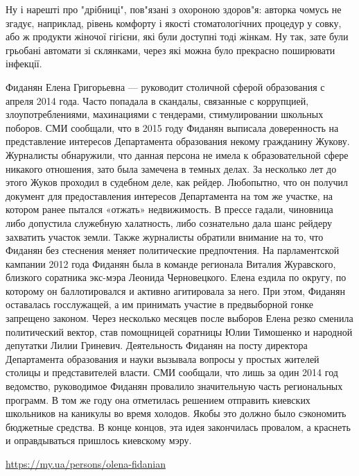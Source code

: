 \begin{itemize}
Ну і нарешті про "дрібниці", пов"язані з охороною здоров"я: авторка чомусь не
згадує, наприклад, рівень комфорту і якості стоматологічних процедур у совку,
або ж продукти жіночої гігієни, які були доступні тоді жінкам. Ну так, зате
були грьобані автомати зі склянками, через які можна було прекрасно поширювати
інфекції.


Фиданян Елена Григорьевна — руководит столичной сферой образования с апреля
2014 года. Часто попадала в скандалы, связанные с коррупцией,
злоупотреблениями, махинациями с тендерами, стимулировании школьных поборов.
СМИ сообщали, что в 2015 году Фиданян выписала доверенность на представление
интересов Департамента образования некому гражданину Жукову. Журналисты
обнаружили, что данная персона не имела к образовательной сфере никакого
отношения, зато была замечена в темных делах. За несколько лет до этого Жуков
проходил в судебном деле, как рейдер. Любопытно, что он получил документ для
предоставления интересов Департамента на том же участке, на котором ранее
пытался «отжать» недвижимость. В прессе гадали, чиновница либо допустила
служебную халатность, либо сознательно дала шанс рейдеру захватить участок
земли. Также журналисты обратили внимание на то, что Фиданян без стеснения
меняет политические предпочтения. На парламентской кампании 2012 года Фиданян
была в команде регионала Виталия Журавского, близкого соратника экс-мэра
Леонида Черновецкого. Елена ездила по округу, по которому он баллотировался и
активно агитировала за него. При этом, Фиданян оставалась госслужащей, а им
принимать участие в предвыборной гонке запрещено законом. Через несколько
месяцев после выборов Елена резко сменила политический вектор, став помощницей
соратницы Юлии Тимошенко и народной депутатки Лилии Гриневич. Деятельность
Фиданян на посту директора Департамента образования и науки вызывала вопросы у
простых жителей столицы и представителей власти. СМИ сообщали, что лишь за один
2014 год ведомство, руководимое Фиданян провалило значительную часть
региональных программ. В том же году она отметилась решением отправить киевских
школьников на каникулы во время холодов. Якобы это должно было сэкономить
бюджетные средства. В конце концов, эта идея закончилась провалом, а краснеть и
оправдываться пришлось киевскому мэру.

\url{https://my.ua/persons/olena-fidanian}



\end{itemize}
